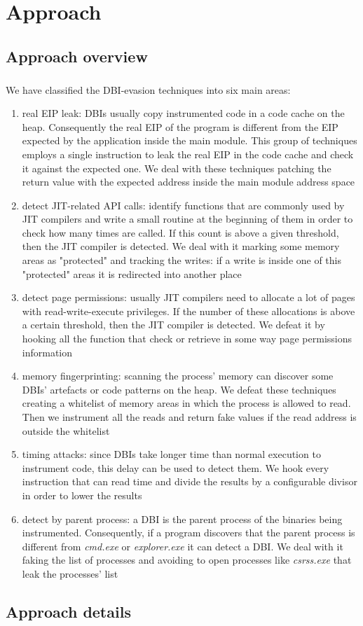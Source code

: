 \chapter{Approach}
\label{chapter3}
\thispagestyle{empty}

\section{Approach overview}
\paragraph{}
We have classified the DBI-evasion techniques into six main areas:
\begin{enumerate}
\item real EIP leak: DBIs usually copy instrumented code in a code cache on the heap. Consequently the real EIP of the program is different from the EIP expected by the application inside the main module. This group of techniques employs a single instruction to leak the real EIP in the code cache and check it against the expected one. We deal with these techniques patching the return value with the expected address inside the main module address space
\item detect JIT-related API calls: identify functions that are commonly used by JIT compilers and write a small routine at the beginning of them in order to check how many times are called. If this count is above a given threshold, then the JIT compiler is detected. We deal with it marking some memory areas as "protected" and tracking the writes: if a write is inside one of this "protected" areas it is redirected into another place
\item detect page permissions: usually JIT compilers need to allocate a lot of pages with read-write-execute privileges. If the number of these allocations is above a certain threshold, then the JIT compiler is detected. We defeat it by hooking all the function that check or retrieve in some way page permissions information
\item memory fingerprinting: scanning the process' memory can discover some DBIs' artefacts or code patterns on the heap. We defeat these techniques creating a whitelist of memory areas in which the process is allowed to read. Then we instrument all the reads and return fake values if the read address is outside the whitelist
\item timing attacks: since DBIs take longer time than normal execution to instrument code, this delay can be used to detect them. We hook every instruction that can read time and divide the results by a configurable divisor in order to lower the results
\item detect by parent process: a DBI is the parent process of the binaries being instrumented. Consequently, if a program discovers that the parent process is different from \textit{cmd.exe} or \textit{explorer.exe} it can detect a DBI. We deal with it faking the list of processes and avoiding to open processes like \textit{csrss.exe} that leak the processes' list
\end{enumerate}
\section{Approach details}


